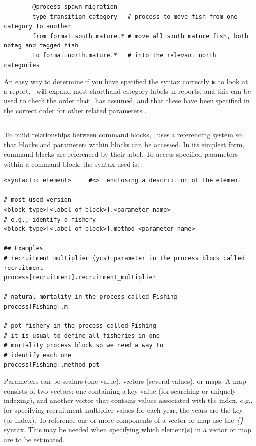 {\small{\begin{verbatim}
		@process spawn_migration
		type transition_category   # process to move fish from one category to another
		from format=south.mature.* # move all south mature fish, both notag and tagged fish
		to format=north.mature.*   # into the relevant north categories
\end{verbatim}}}

An easy way to determine if you have specified the syntax correctly is to look at a report. \CNAME\ will expand most shorthand category labels in reports, and this can be used to check the order that \CNAME\ has assumed, and that these have been specified in the correct order for other related parameters . 

\subsection{\label{sec:params}}

To build relationships between command blocks, \CNAME\ uses  a referencing system so that blocks and parameters within blocks can be accessed. In its simplest form, command blocks are referenced by their label. To access specified parameters within a command block, the syntax used is:

{\small{\begin{verbatim}
<syntactic element>     #<>  enclosing a description of the element

# most used version
<block type>[<label of block>].<parameter name>
# e.g., identify a fishery
<block type>[<label of block>].method_<parameter name>

## Examples
# recruitment multiplier (ycs) parameter in the process block called recruitment
process[recruitment].recruitment_multiplier

# natural mortality in the process called Fishing
process[Fishing].m

# pot fishery in the process called Fishing
# it is usual to define all fisheries in one
# mortality process block so we need a way to
# identify each one
process[Fishing].method_pot
\end{verbatim}}}

Parameters can be scalars (one value), vectors (several values), or maps. A map consists of two vectors: one containing a key value (for searching or uniquely indexing), and another vector that contains values associated with the index, e.g., for specifying recruitment multiplier values for each year, the years are the key (or index). To reference one or more components of a vector or map use the \textit{\{\}} syntax. This may be needed when specifying which element(s) in a vector or map are to be estimated.

